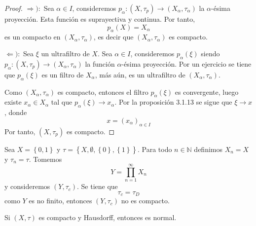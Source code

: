 \documentclass[12pt]{report}
\theoremstyle{largebreak}
\newcommand\cf[3]{\ensuremath{#1:#2\rightarrow#3}}
\begin{document}
    \begin{proof}
        $\Rightarrow):$ Sea $\alpha\in I$, consideremos $\cf{p_\alpha}{(X,\tau_p)}{(X_\alpha,\tau_\alpha)}$ la $\alpha$-ésima proyección. Esta función es suprayectiva y continua. Por tanto,
        \begin{equation*}
            p_\alpha(X)=X_\alpha
        \end{equation*}
        es un compacto en $(X_\alpha,\tau_\alpha)$, es decir que $(X_\alpha,\tau_\alpha)$ es compacto.

        $\Leftarrow):$ Sea $\xi$ un ultrafiltro de $X$. Sea $\alpha\in I$, consideremos $p_\alpha(\xi)$ siendo $\cf{p_\alpha}{(X,\tau_p)}{(X_\alpha,\tau_\alpha)}$ la función $\alpha$-ésima proyección. Por un ejercicio se tiene que $p_\alpha(\xi)$ es un filtro de $X_\alpha$, más aún, es un ultrafiltro de $(X_\alpha,\tau_\alpha)$.

        Como $(X_\alpha,\tau_\alpha)$ es compacto, entonces el filtro $p_\alpha(\xi)$ es convergente, luego existe $x_\alpha\in X_\alpha$ tal que $p_\alpha(\xi)\rightarrow x_\alpha$. Por la proposición 3.1.13 se sigue que $\xi\rightarrow x$, donde
        \begin{equation*}
            x=\left(x_\alpha \right)_{\alpha\in I}
        \end{equation*}
        Por tanto, $(X,\tau_p)$ es compacto.
    \end{proof}

    \begin{exa}
        Sea $X=\left\{0,1\right\}$ y $\tau=\left\{X,\emptyset,\left\{0 \right\},\left\{1\right\} \right\}$. Para todo $n\in\mathbb{N}$ definimos $X_n=X$ y $\tau_n=\tau$. Tomemos
        \begin{equation*}
            Y=\prod_{ n=1}^\infty X_n
        \end{equation*}
        y consideremos $(Y,\tau_c)$. Se tiene que
        \begin{equation*}
            \tau_c=\tau_D
        \end{equation*}
        como $Y$ es no finito, entonces $(Y,\tau_c)$ no es compacto.
    \end{exa}

    \begin{theor}
        Si $(X,\tau)$ es compacto y Hausdorff, entonces es normal.
    \end{theor}
\end{document}
